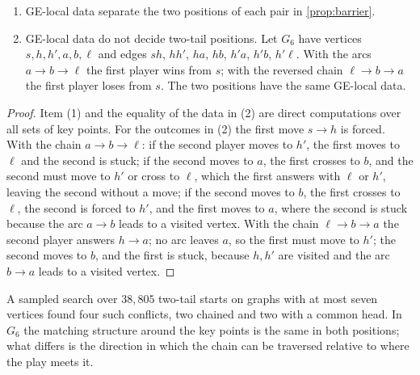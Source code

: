 \documentclass[final]{siamart0516}
\numberwithin{theorem}{section}
\numberwithin{equation}{section}
\theoremstyle{siamnonum}
\theoremstyle{plain}
\begin{document}
\begin{proposition}\label{prop:ge-barrier}
\begin{enumerate}[label=\textup{(\arabic*)}]
\item GE-local data separate the two positions of each pair in \cref{prop:barrier}.
\item GE-local data do not decide two-tail positions. Let $G_6$ have vertices $s,h,h',a,b,\ell$ and edges $sh$, $hh'$, $ha$, $hb$, $h'a$, $h'b$, $h'\ell$. With the arcs $a\to b\to\ell$ the first player wins from $s$; with the reversed chain $\ell\to b\to a$ the first player loses from $s$. The two positions have the same GE-local data.
\end{enumerate}
\end{proposition}
\begin{proof}
Item (1) and the equality of the data in (2) are direct computations over all sets of key points. For the outcomes in (2) the first move $s\to h$ is forced. With the chain $a\to b\to\ell$: if the second player moves to $h'$, the first moves to $\ell$ and the second is stuck; if the second moves to $a$, the first crosses to $b$, and the second must move to $h'$ or cross to $\ell$, which the first answers with $\ell$ or $h'$, leaving the second without a move; if the second moves to $b$, the first crosses to $\ell$, the second is forced to $h'$, and the first moves to $a$, where the second is stuck because the arc $a\to b$ leads to a visited vertex. With the chain $\ell\to b\to a$ the second player answers $h\to a$; no arc leaves $a$, so the first must move to $h'$; the second moves to $b$, and the first is stuck, because $h,h'$ are visited and the arc $b\to a$ leads to a visited vertex.
\end{proof}

A sampled search over $38{,}805$ two-tail starts on graphs with at most seven vertices found four such conflicts, two chained and two with a common head. In $G_6$ the matching structure around the key points is the same in both positions; what differs is the direction in which the chain can be traversed relative to where the play meets it.
\end{document}
